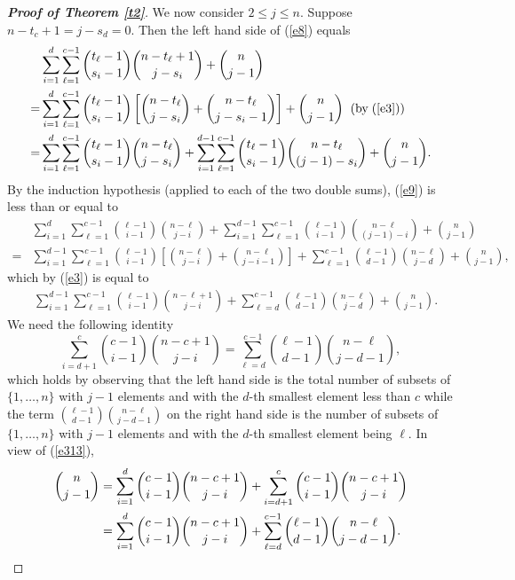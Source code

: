 \documentclass[12pt, A4paper, oneside]{article}
\theoremstyle{plain}
\numberwithin{equation}{section}
\begin{document}
\begin{proof}[\bf Proof of Theorem \ref{t2}]
We now consider $2\le j\le n$. Suppose $n-t_{c}+1=j-s_{d}=0$. Then the left hand side of (\ref{e8}) equals
\begin{align}
&\sum_{i=1}^{d}\sum_{\ell=1}^{c-1}{t_\ell-1\choose s_i-1}{n-t_\ell+1\choose j-s_i}+{n\choose j-1}\notag\\
=&\sum_{i=1}^{d}\sum_{\ell=1}^{c-1}{t_\ell-1\choose s_i-1}\left[{n-t_\ell\choose j-s_i}+{n-t_\ell\choose j-s_i-1}\right]+{n\choose j-1}\;\;(\mbox{by}\;(\ref{e3}))\notag\\
=&\sum_{i=1}^{d}\sum_{\ell=1}^{c-1}{t_\ell-1\choose s_i-1}{n-t_\ell\choose j-s_i}+\sum_{i=1}^{d-1}\sum_{\ell=1}^{c-1}{t_\ell-1\choose s_i-1}{n-t_\ell\choose (j-1)-s_i}+{n\choose j-1}.\label{e9}
\end{align}
By the induction hypothesis (applied to each of the two double sums), (\ref{e9}) is less than or equal to
\begin{align*}
&\sum_{i=1}^d\sum_{\ell=1}^{c-1}{\ell-1\choose i-1}{n-\ell\choose j-i}+\sum_{i=1}^{d-1}\sum_{\ell=1}^{c-1}{\ell-1\choose i-1}
{n-\ell\choose (j-1)-i}+{n\choose j-1}\\
=&\sum_{i=1}^{d-1}\sum_{\ell=1}^{c-1}{\ell-1\choose i-1}\left[{n-\ell\choose j-i}+{n-\ell\choose j-i-1}\right]+\sum_{\ell=1}^{c-1}{\ell-1\choose d-1}{n-\ell\choose j-d}+{n\choose j-1},
\end{align*}
which by (\ref{e3}) is  equal to
\begin{align}
&\sum_{i=1}^{d-1}\sum_{\ell=1}^{c-1}{\ell-1\choose i-1}{n-\ell+1\choose j-i}+\sum_{\ell=d}^{c-1}{\ell-1\choose d-1}{n-\ell\choose j-d}+{n\choose j-1}\label{e10}.
\end{align}
We need the following identity
\begin{equation}\label{e313}
\sum_{i=d+1}^{c}{c-1\choose i-1}{n-c+1\choose j-i}=\sum_{\ell=d}^{c-1}{\ell-1\choose d-1}{n-\ell\choose j-d-1},
\end{equation}
which holds by observing that the left hand side is the total number of subsets of $\{1,\dots,n\}$ with $j-1$ elements and with the $d$-th smallest element less than $c$ while the term ${\ell-1\choose d-1}{n-\ell\choose j-d-1}$ on the right hand side is the number of subsets of $\{1,\dots,n\}$ with $j-1$ elements
and with the $d$-th smallest element being $\ell$.
 In view of (\ref{e313}),
\begin{align}
{n\choose j-1}&=\sum_{i=1}^{d}{c-1\choose i-1}{n-c+1\choose j-i}+\sum_{i=d+1}^{c}{c-1\choose i-1}{n-c+1\choose j-i}\notag\\
&=\sum_{i=1}^{d}{c-1\choose i-1}{n-c+1\choose j-i}+\sum_{\ell=d}^{c-1}{\ell-1\choose d-1}{n-\ell\choose j-d-1}.\label{e314}

\end{align}
\end{proof}
\end{document}
